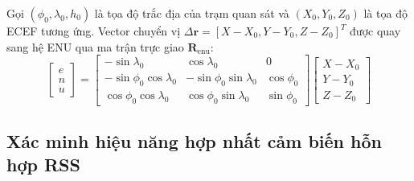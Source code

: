 \hspace{0.5cm} Gọi $(\phi_0, \lambda_0, h_0)$ là tọa độ trắc địa của trạm quan sát và $(X_0, Y_0, Z_0)$ là tọa độ ECEF tương ứng. Vector chuyển vị $\Delta \mathbf{r} = [X - X_0, Y - Y_0, Z - Z_0]^T$ được quay sang hệ ENU qua ma trận trực giao $\mathbf{R}_{\text{enu}}$:
\begin{equation}
\begin{bmatrix} e \\ n \\ u \end{bmatrix} = \begin{bmatrix}
-\sin\lambda_0 & \cos\lambda_0 & 0 \\
-\sin\phi_0\cos\lambda_0 & -\sin\phi_0\sin\lambda_0 & \cos\phi_0 \\
\cos\phi_0\cos\lambda_0 & \cos\phi_0\sin\lambda_0 & \sin\phi_0
\end{bmatrix} \begin{bmatrix} X - X_0 \\ Y - Y_0 \\ Z - Z_0 \end{bmatrix}
\label{eq:ecef-to-enu-rotation-matrix}
\end{equation}

\begin{table}[H]
\centering
\caption{Kết quả đo đạc độ chính xác khứ hồi trên 1.000 tọa độ trắc địa ngẫu nhiên tại Việt Nam}
\label{tab:geodetic-verification-metrics}
\end{table}

\subsection{Xác minh hiệu năng hợp nhất cảm biến hỗn hợp RSS}

